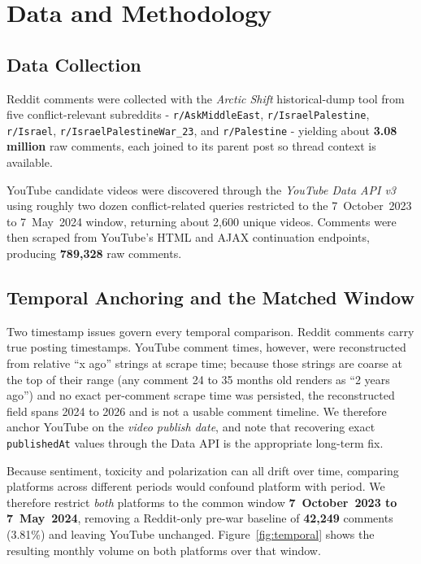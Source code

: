 \documentclass[10pt,twocolumn]{article}
\begin{document}
\section{Data and Methodology}
\label{sec:data}
\subsection{Data Collection}
Reddit comments were collected with the \textit{Arctic Shift} historical-dump tool
from five conflict-relevant subreddits - \texttt{r/AskMiddleEast},
\texttt{r/IsraelPalestine}, \texttt{r/Israel}, \texttt{r/IsraelPalestineWar\_23},
and \texttt{r/Palestine} - yielding about \textbf{3.08 million} raw comments, each
joined to its parent post so thread context is available.

YouTube candidate videos were discovered through the \textit{YouTube Data API v3}
using roughly two dozen conflict-related queries restricted to the
7~October~2023 to 7~May~2024 window, returning about 2{,}600 unique videos. Comments
were then scraped from YouTube's HTML and AJAX continuation endpoints, producing
\textbf{789{,}328} raw comments.

\subsection{Temporal Anchoring and the Matched Window}
Two timestamp issues govern every temporal comparison. Reddit comments carry true
posting timestamps. YouTube comment times, however, were reconstructed from relative
``x ago'' strings at scrape time; because those strings are coarse at the top of
their range (any comment 24 to 35 months old renders as ``2 years ago'') and no exact
per-comment scrape time was persisted, the reconstructed field spans 2024 to 2026 and
is not a usable comment timeline. We therefore anchor YouTube on the \emph{video
publish date}, and note that recovering exact \texttt{publishedAt} values through the
Data API is the appropriate long-term fix.

Because sentiment, toxicity and polarization can all drift over time, comparing
platforms across different periods would confound platform with period. We therefore
restrict \emph{both} platforms to the common window
\textbf{7~October~2023 to 7~May~2024}, removing a Reddit-only pre-war baseline of
\textbf{42{,}249} comments (3.81\%) and leaving YouTube unchanged. Figure~\ref{fig:temporal} shows
the resulting monthly volume on both platforms over that window.
\end{document}
